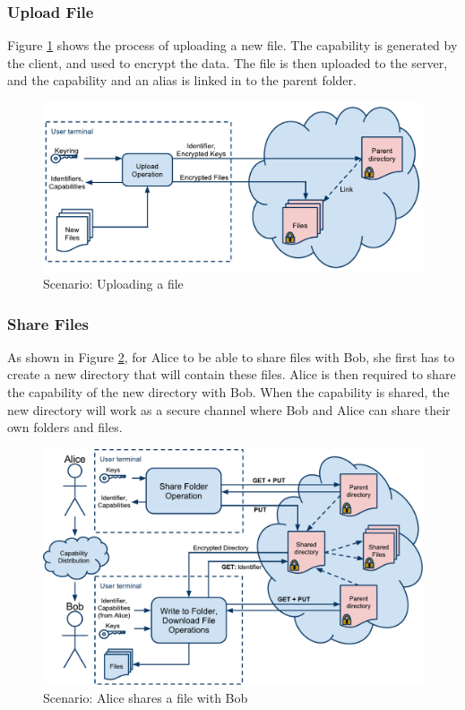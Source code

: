 \documentclass[pdftex,english,10pt,b5paper,twoside]{book}
\begin{document}
\subsubsection{Upload File}

Figure \ref{fig:AS:upload} shows the process of uploading a new file. The
capability is generated by the client, and used to encrypt the data. The file
is then uploaded to the server, and the capability and an alias is linked in to
the parent folder.

\begin{figure}[h!]
    \centering
    \includegraphics[width=\columnwidth]{ArchitectureUpload.pdf}
    \caption{Scenario: Uploading a file}
    \label{fig:AS:upload}
\end{figure}

\subsubsection{Share Files}

As shown in Figure \ref{fig:AS:sharing}, for Alice to be able to share files
with Bob, she first has to create a new directory that will contain these
files. Alice is then required to share the capability of the new directory with
Bob. When the capability is shared, the new directory will work as a secure
channel where Bob and Alice can share their own folders and files.

\begin{figure}[h!]
    \centering
    \includegraphics[width=\columnwidth]{ArchitectureShare.pdf}
    \caption{Scenario: Alice shares a file with Bob}
    \label{fig:AS:sharing}
\end{figure}
\end{document}

